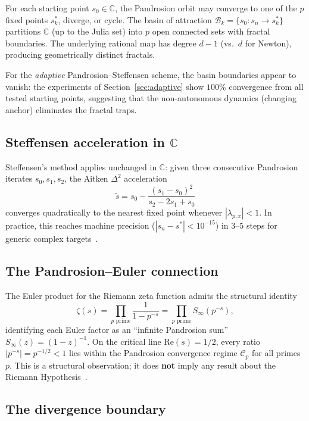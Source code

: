 \documentclass[11pt,a4paper]{article}
\theoremstyle{definition}
\newcommand{\CC}{\mathbb{C}}
\begin{document}
For each starting point $s_0 \in \CC$, the Pandrosion orbit may converge to one of the $p$ fixed points $s_k^*$, diverge, or cycle.  The basin of attraction $\mathcal{B}_k = \{s_0 : s_n \to s_k^*\}$ partitions $\CC$ (up to the Julia set) into $p$ open connected sets with fractal boundaries.  The underlying rational map has degree $d-1$ (vs.\ $d$ for Newton), producing geometrically distinct fractals.

For the \emph{adaptive} Pandrosion--Steffensen scheme, the basin boundaries appear to vanish: the experiments of Section~\ref{sec:adaptive} show $100\%$ convergence from all tested starting points, suggesting that the non-autonomous dynamics (changing anchor) eliminates the fractal traps.

\subsection{Steffensen acceleration in $\CC$}
\label{sec:steffensen_complex}

Steffensen's method applies unchanged in $\CC$: given three consecutive Pandrosion iterates $s_0, s_1, s_2$, the Aitken $\Delta^2$ acceleration
\[
  \tilde{s} = s_0 - \frac{(s_1 - s_0)^2}{s_2 - 2s_1 + s_0}
\]
converges quadratically to the nearest fixed point whenever $|\lambda_{p,x}| < 1$.  In practice, this reaches machine precision ($|s_n - s^*| < 10^{-15}$) in $3$--$5$ steps for generic complex targets~\cite[Table~4]{besevic2026complex}.

\subsection{The Pandrosion--Euler connection}
\label{sec:euler}

The Euler product for the Riemann zeta function admits the structural identity
\[
  \zeta(s) = \prod_{p \text{ prime}} \frac{1}{1 - p^{-s}} = \prod_{p \text{ prime}} S_\infty(p^{-s}),
\]
identifying each Euler factor as an ``infinite Pandrosion sum'' $S_\infty(z) = (1-z)^{-1}$.  On the critical line $\mathrm{Re}(s) = 1/2$, every ratio $|p^{-s}| = p^{-1/2} < 1$ lies within the Pandrosion convergence regime $\mathcal{C}_p$ for all primes $p$.  This is a structural observation; it does \textbf{not} imply any result about the Riemann Hypothesis~\cite[\S6]{besevic2026complex}.

\subsection{The divergence boundary}
\label{sec:divergence}
\end{document}
